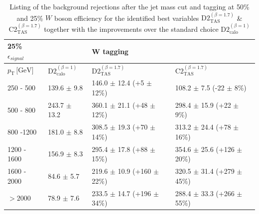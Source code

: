 \begin{table}[]
\begin{tabular}{llll}
 \multicolumn{1}{l||}{  \textbf{25\% $\epsilon_{signal}$}} &                                                &  \textbf{W tagging}                                         &                                          \\ \hline
\multicolumn{1}{l||}{$p_{\mathrm{T}} \, \text{[GeV]}$}           & \multicolumn{1}{l|}{$\text{D2}_{\text{calo}}^{(\beta=1)}$} & \multicolumn{1}{l|}{$\text{D2}_{\text{TAS}}^{(\beta=1.7)}$} & \multicolumn{1}{l|}{$\text{C2}_{\text{TAS}}^{(\beta=1.7)}$} \\ \hline \hline
\multicolumn{1}{l||}{250 - 500}                       & \multicolumn{1}{l|}{139.6 $\pm$ 9.8}                     	& \multicolumn{1}{l|}{146.0 $\pm$ 12.4 (+5 $\pm$ 12\%)}         & \multicolumn{1}{l|}{108.2 $\pm$ 7.5 (-22 $\pm$ 8\%)}       \\
\multicolumn{1}{l||}{500 - 800}                       & \multicolumn{1}{l|}{243.7 $\pm$ 13.2}                     	& \multicolumn{1}{l|}{360.1 $\pm$ 21.1 (+48 $\pm$ 12\%)}        & \multicolumn{1}{l|}{298.4 $\pm$ 15.9 (+22 $\pm$ 9\%)}        \\
\multicolumn{1}{l||}{800 -1200}                       & \multicolumn{1}{l|}{181.0 $\pm$ 8.8}                     	& \multicolumn{1}{l|}{308.5 $\pm$ 19.3 (+70 $\pm$ 14\%)}        & \multicolumn{1}{l|}{313.2 $\pm$ 24.4 (+78 $\pm$ 16\%)}       \\
\multicolumn{1}{l||}{1200 - 1600}                     & \multicolumn{1}{l|}{156.9 $\pm$ 8.3}                     	& \multicolumn{1}{l|}{295.4 $\pm$ 17.8 (+88 $\pm$ 15\%)}        & \multicolumn{1}{l|}{354.6 $\pm$ 25.6 (+126 $\pm$ 20\%)}      \\
\multicolumn{1}{l||}{1600 - 2000}                     & \multicolumn{1}{l|}{84.6 $\pm$ 5.7}                      	& \multicolumn{1}{l|}{219.6 $\pm$ 10.9 (+160 $\pm$ 22\%)}       & \multicolumn{1}{l|}{320.5 $\pm$ 31.4 (+279 $\pm$ 45\%)}       \\
\multicolumn{1}{l||}{$>2000$}                         & \multicolumn{1}{l|}{78.9 $\pm$ 7.6}                      	& \multicolumn{1}{l|}{233.5 $\pm$ 14.7 (+196 $\pm$ 34\%)}       & \multicolumn{1}{l|}{288.4 $\pm$ 33.3 (+266 $\pm$ 55\%)}      \\ \hline
\end{tabular}

\caption{Listing of the background rejections after the jet mass cut and tagging at 50\% and 25\% $W$ boson efficiency for the identified best variables $\text{D2}_{\text{TAS}}^{(\beta=1.7)}$ \& $\text{C2}_{\text{TAS}}^{(\beta=1.7)}$ together with the improvements over the standard choice $\text{D2}_{\text{calo}}^{(\beta=1)}$}\label{table:w_improvement}
\end{table}




